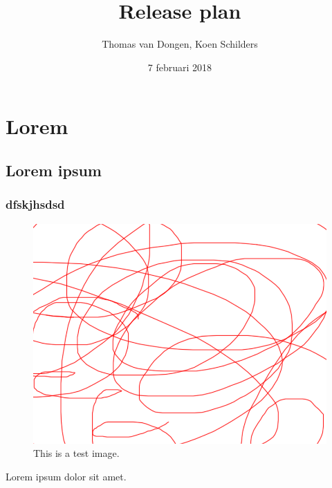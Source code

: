 \documentclass[12pt]{article}
\title{Release plan}
\author{Thomas van Dongen, Koen Schilders}
\date{7 februari 2018}
\begin{document}
\begin{titlepage}
\maketitle
\end{titlepage}

\section{Lorem}
\subsection{Lorem ipsum}
\subsubsection{dfskjhsdsd}

\begin{figure}
	\includegraphics[width=\textwidth]{images/test.png}
	\caption{This is a test image.}
\end{figure}

Lorem ipsum dolor sit amet.
\end{document}

